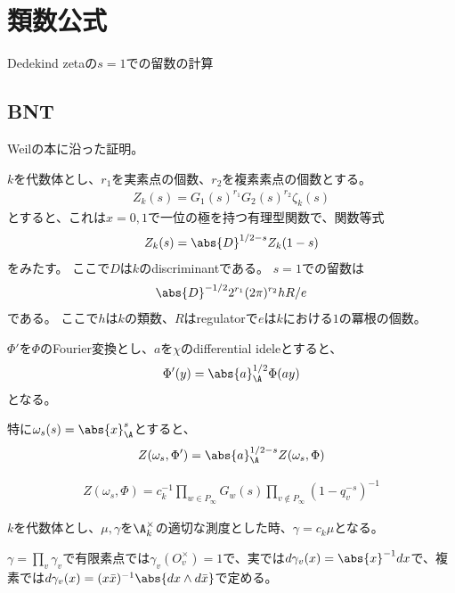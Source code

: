 \documentclass[uplatex, a4paper]{jsbook}
\begin{document}
\section{類数公式}
Dedekind zetaの$s=1$での留数の計算

\subsection{BNT}
Weilの本に沿った証明。

\begin{thm}[Theoerm 3, p.129]
$k$を代数体とし、$r_1$を実素点の個数、$r_2$を複素素点の個数とする。
\begin{align*}
Z_k(s)=G_1(s)^{r_1}G_2(s)^{r_2}\zeta_k(s)
\end{align*}
とすると、これは$x=0, 1$で一位の極を持つ有理型関数で、関数等式
\begin{align*}
Z_k(s)=\abs{D}^{1/2-s}Z_k(1-s)
\end{align*}
をみたす。
ここで$D$は$k$のdiscriminantである。
$s=1$での留数は
\begin{align*}
\abs{D}^{-1/2}2^{r_1}(2\pi)^{r_2}hR/e
\end{align*}
である。
ここで$h$は$k$の類数、$R$はregulatorで$e$は$k$における$1$の冪根の個数。
\end{thm}

$\Phi'$を$\Phi$のFourier変換とし、$a$を$\chi$のdifferential ideleとすると、
\begin{align*}
\Phi'(y)=\abs{a}^{1/2}_{\A}\Phi(ay)
\end{align*}
となる。

特に$\omega_s(s)=\abs{x}^s_{\A}$とすると、
\begin{align}
Z(\omega_s, \Phi')=\abs{a}^{1/2-s}_{\A}Z(\omega_s,\Phi)
\end{align}

\begin{align}
Z(\omega_s,\Phi)=c_k^{-1}\prod_{w\in P_\infty}G_w(s)\prod_{v\notin P_\infty}(1-q_v^{-s})^{-1}
\end{align}

\begin{prop}[Proposition 12, p.128]
$k$を代数体とし、$\mu, \gamma$を$\A_k^\times$の適切な測度とした時、$\gamma=c_k\mu$となる。

$\gamma=\prod_v\gamma_v$で有限素点では$\gamma_v(O_v^\times)=1$で、実では$d\gamma_v(x)=\abs{x}^{-1}dx$で、複素では$d\gamma_v(x)=(x\bar{x})^{-1}\abs{dx\wedge d\bar{x}}$で定める。
\end{prop}
\end{document}
